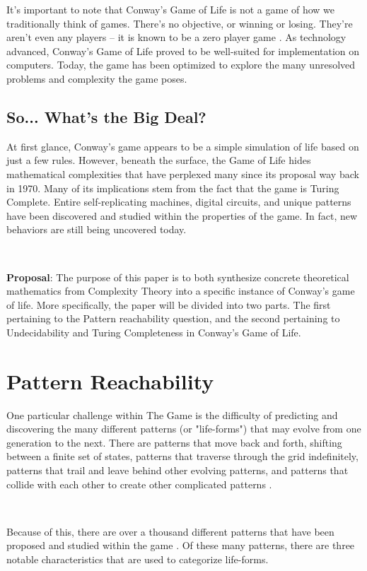 \documentclass{article}
\theoremstyle{definition}
\theoremstyle{plain}
\theoremstyle{plain}
\begin{document}
It’s important to note that Conway’s Game of Life is not a game of how we traditionally think of games. There’s no objective, or winning or losing. They’re aren’t even any players – it is known to be a zero player game \cite{Beginning_Life_2006}. As technology advanced, Conway’s Game of Life proved to be well-suited for implementation on computers. Today, the game has been optimized to explore the many unresolved problems and complexity the game poses. 

\subsection{So... What's the Big Deal?}

At first glance, Conway’s game appears to be a simple simulation of life based on just a few rules. However, beneath the surface, the Game of Life hides mathematical complexities that have perplexed many since its proposal way back in 1970. Many of its implications stem from the fact that the game is Turing Complete. Entire self-replicating machines, digital circuits, and unique patterns have been discovered and studied within the properties of the game. In fact, new behaviors are still being uncovered today. 

\ 

\textbf{Proposal}: The purpose of this paper is to both synthesize concrete theoretical mathematics from Complexity Theory into a specific instance of Conway's game of life. More specifically, the paper will be divided into two parts. The first pertaining to the Pattern reachability question, and the second pertaining to Undecidability and Turing Completeness in Conway’s Game of Life. 

\section {Pattern Reachability}

One particular challenge within The Game is the difficulty of predicting and discovering the many different patterns (or "life-forms") that may evolve from one generation to the next. There are patterns that move back and forth, shifting between a finite set of states, patterns that traverse through the grid indefinitely, patterns that trail and leave behind other evolving patterns, and patterns that collide with each other to create other complicated patterns \cite{JG2022conway}.

\

Because of this, there are over a thousand different patterns that have been proposed and studied within the game \cite{Life_Wiki}. Of these many patterns, there are three notable characteristics that are used to categorize life-forms. 
\end{document}
